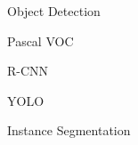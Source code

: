 \begin{frame}
  Object Detection
  \note{
    \begin{itemize}
      \item
      \item
    \end{itemize}
  }
\end{frame}

\begin{frame}
  Pascal VOC
  \note{
    \begin{itemize}
      \item
      \item
    \end{itemize}
  }
\end{frame}

\begin{frame}
  R-CNN
  \note{
    \begin{itemize}
      \item
      \item
    \end{itemize}
  }
\end{frame}


\begin{frame}
  YOLO
  \note{
    \begin{itemize}
      \item
      \item
    \end{itemize}
  }
\end{frame}


\begin{frame}
  Instance Segmentation
  \note{
    \begin{itemize}
      \item
      \item
    \end{itemize}
  }
\end{frame}                     %

